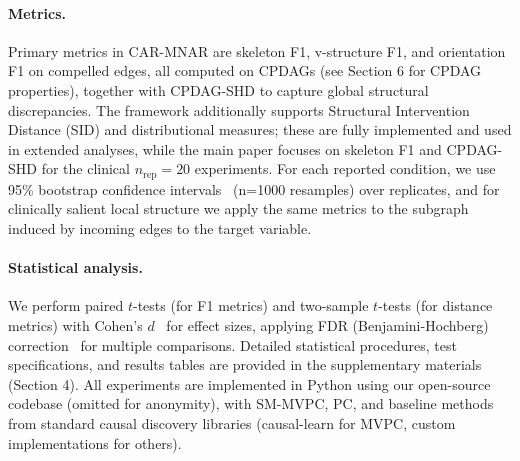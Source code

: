 \documentclass[runningheads]{llncs}
\newcommand{\Matin}{\textcolor{magenta}}
\begin{document}
\paragraph{Metrics.} 
Primary metrics in CAR-MNAR are skeleton F1, v-structure F1, and orientation F1 on compelled edges, all computed on CPDAGs (see Section 6 for CPDAG properties), together with CPDAG-SHD to capture global structural discrepancies. The framework additionally supports Structural Intervention Distance (SID) and distributional measures; these are fully implemented and used in extended analyses, while the main paper focuses on skeleton F1 and CPDAG-SHD for the clinical $n_{\text{rep}}=20$ experiments. For each reported condition, we use 95\% bootstrap confidence intervals~\cite{efron1992bootstrap} (n=1000 resamples) over replicates, and for clinically salient local structure we apply the same metrics to the subgraph induced by incoming edges to the target variable.

\paragraph{Statistical analysis.}
We perform paired $t$-tests (for F1 metrics) and two-sample $t$-tests (for distance metrics) with Cohen's $d$~\cite{cohen2013statistical} for effect sizes, applying FDR (Benjamini-Hochberg) correction~\cite{benjamini1995controlling} for multiple comparisons. Detailed statistical procedures, test specifications, and results tables are provided in the supplementary materials (Section 4). All experiments are implemented in Python using our open-source codebase (omitted for anonymity), with SM-MVPC, PC, and baseline methods from standard causal discovery libraries (causal-learn for MVPC, custom implementations for others).

\end{document}
